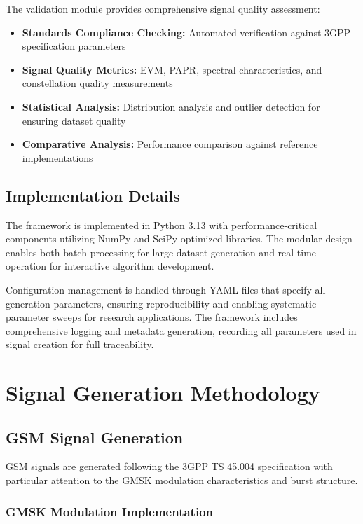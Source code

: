 \documentclass[conference]{IEEEtran}
\begin{document}
The validation module provides comprehensive signal quality assessment:

\begin{itemize}
\item \textbf{Standards Compliance Checking:} Automated verification against 3GPP specification parameters
\item \textbf{Signal Quality Metrics:} EVM, PAPR, spectral characteristics, and constellation quality measurements
\item \textbf{Statistical Analysis:} Distribution analysis and outlier detection for ensuring dataset quality
\item \textbf{Comparative Analysis:} Performance comparison against reference implementations
\end{itemize}

\subsection{Implementation Details}

The framework is implemented in Python 3.13 with performance-critical components utilizing NumPy and SciPy optimized libraries. The modular design enables both batch processing for large dataset generation and real-time operation for interactive algorithm development.

Configuration management is handled through YAML files that specify all generation parameters, ensuring reproducibility and enabling systematic parameter sweeps for research applications. The framework includes comprehensive logging and metadata generation, recording all parameters used in signal creation for full traceability.

\section{Signal Generation Methodology}
\label{sec:signal_generation}

\subsection{GSM Signal Generation}

GSM signals are generated following the 3GPP TS 45.004 specification with particular attention to the GMSK modulation characteristics and burst structure.

\subsubsection{GMSK Modulation Implementation}
\end{document}
